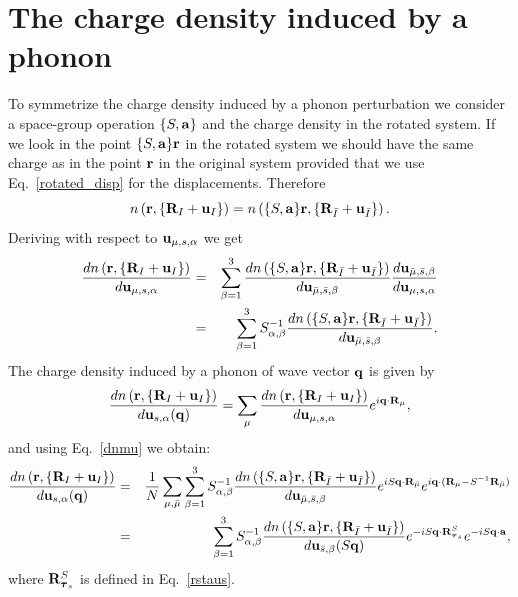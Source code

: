 \documentclass[12pt,a4paper,twoside]{report}
\begin{document}
\section{The charge density induced by a phonon}

To symmetrize the charge density induced by a phonon perturbation we consider a space-group operation $\{S,{\bf a}\}$
and the charge density in the rotated system. If
we look in the point $\{S,{\bf a}\} {\bf r}$ in the rotated system we should have the same charge as in the 
point ${\bf r}$ in the original system provided that we use Eq.~\ref{rotated_disp} for the displacements.
Therefore
\begin{equation}
n\left({\bf r}, \{{\bf R}_I + {\bf u}_I\}\right)
=n\left(\{S,{\bf a}\} {\bf r}, \{{\bf R}_{\bar I} + {\bf u}_{\bar I}\}\right).
\end{equation}
Deriving with respect to ${\bf u}_{\mu,s,\alpha}$ we get
\begin{eqnarray}
{d n\left({\bf r}, \{{\bf R}_I + {\bf u}_I\}\right)
\over d {\bf u}_{\mu,s,\alpha}}
&=&\sum_{\beta=1}^3 {d n\left(\{S,{\bf a}\} {\bf r}, \{{\bf R}_{\bar I} + {\bf u}_{\bar I}\}\right)
\over d {\bf u}_{\bar \mu,\bar s,\beta}} {d {\bf u}_{\bar \mu,\bar s,\beta} \over  
d {\bf u}_{\mu,s,\alpha} } \nonumber \\
&=& \sum_{\beta=1}^3 S^{-1}_{\alpha,\beta} {d n\left(\{S,{\bf a}\} {\bf r}, \{{\bf R}_{\bar I} + {\bf u}_{\bar I}\}\right)
\over d {\bf u}_{\bar \mu,\bar s,\beta}}.
\label{dnmu}
\end{eqnarray}
The charge density induced by a phonon of wave vector ${\bf q}$ is given by
\begin{equation}
{d n\left({\bf r}, \{{\bf R}_I + {\bf u}_I\}\right)
\over d {\bf u}_{s,\alpha}({\bf q})} =
\sum_\mu {d n\left({\bf r}, \{{\bf R}_I + {\bf u}_I\}\right)
\over d {\bf u}_{\mu,s,\alpha}} e^{i{\bf q}\cdot {\bf R}_\mu},
\label{drhoph}
\end{equation}
and using Eq.~\ref{dnmu} we obtain:
\begin{eqnarray}
{d n\left({\bf r}, \{{\bf R}_I + {\bf u}_I\}\right)
\over d {\bf u}_{s,\alpha}({\bf q})} &=&
{1\over N}\sum_{\mu,\bar \mu} \sum_{\beta=1}^3 S^{-1}_{\alpha,\beta} {d n\left(\{S,{\bf a}\} {\bf r}, \{{\bf R}_{\bar I} + {\bf u}_{\bar I}\}\right)
\over d {\bf u}_{\bar \mu,\bar s,\beta}}e^{iS{\bf q}\cdot {\bf R}_{\bar \mu} } e^{i{\bf q}\cdot ({\bf R}_\mu - S^{-1}{\bf R}_{\bar \mu}) } \nonumber \\
&=& \sum_{\beta=1}^3 S^{-1}_{\alpha,\beta} {d n\left(\{S,{\bf a}\} {\bf r}, \{{\bf R}_{\bar I} + {\bf u}_{\bar I}\}\right)
\over d {\bf u}_{\bar s,\beta} (S{\bf q})} e^{-iS{\bf q}\cdot {\bf R}^S_{{\boldsymbol{\tau}_s}}} e^{-iS{\bf q}\cdot {\bf a}},
\end{eqnarray}
where ${\bf R}^S_{{\boldsymbol{\tau}_s}}$ is defined in Eq.~\ref{rstaus}.
\end{document}
